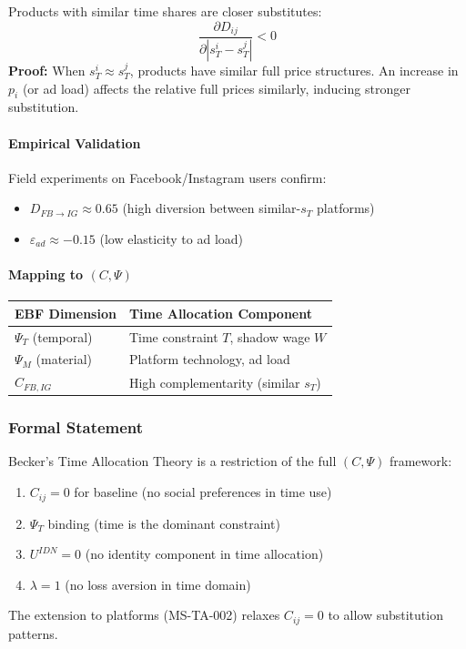 \begin{proposition}
\label{prop:der-ta2}
Products with similar time shares are closer substitutes:
\[
\frac{\partial D_{ij}}{\partial |s_T^i - s_T^j|} < 0
\]
\textbf{Proof:} When $s_T^i \approx s_T^j$, products have similar full price structures. An increase in $p_i$ (or ad load) affects the relative full prices similarly, inducing stronger substitution.
\end{proposition}

\paragraph{Empirical Validation}
Field experiments on Facebook/Instagram users confirm:
\begin{itemize}
\item $D_{FB \to IG} \approx 0.65$ (high diversion between similar-$s_T$ platforms)
\item $\varepsilon_{ad} \approx -0.15$ (low elasticity to ad load)
\end{itemize}

\paragraph{Mapping to $(C, \Psi)$}
\begin{center}
\begin{tabular}{ll}
\toprule
EBF Dimension & Time Allocation Component \\
\midrule
$\Psi_T$ (temporal) & Time constraint $T$, shadow wage $W$ \\
$\Psi_M$ (material) & Platform technology, ad load \\
$C_{FB,IG}$ & High complementarity (similar $s_T$) \\
\bottomrule
\end{tabular}
\end{center}

\subsubsection{Formal Statement}

\begin{proposition}
\label{prop:der-ta3}
Becker's Time Allocation Theory is a restriction of the full $(C, \Psi)$ framework:
\begin{enumerate}
\item $C_{ij} = 0$ for baseline (no social preferences in time use)
\item $\Psi_T$ binding (time is the dominant constraint)
\item $U^{IDN} = 0$ (no identity component in time allocation)
\item $\lambda = 1$ (no loss aversion in time domain)
\end{enumerate}
The extension to platforms (MS-TA-002) relaxes $C_{ij} = 0$ to allow substitution patterns.
\end{proposition}

